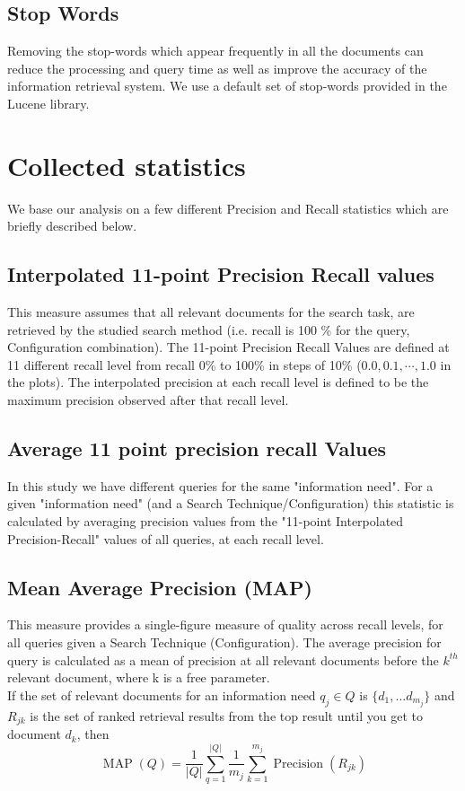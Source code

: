 \documentclass[report,draft*]{aaltoseries}
\begin{document}
\subsection{Stop Words}
Removing the stop-words which appear frequently in all the documents can reduce the processing and query time as well as improve the accuracy of the information retrieval system. We use a default set of stop-words provided in the Lucene library. 


\section{Collected statistics}
We base our analysis on a few different Precision and Recall statistics which are briefly described below.
\subsection{Interpolated 11-point Precision Recall values}
This measure assumes that all relevant documents for the search task, are retrieved by the studied search method (i.e. recall is 100 \% for the query, Configuration combination). The 11-point Precision Recall Values are defined at 11 different recall level from recall 0\% to 100\% in steps of 10\% ($0.0, 0.1,\cdots, 1.0$ in the plots). The interpolated precision at each recall level is defined to be the maximum precision observed after that recall level.        
\subsection{Average 11 point precision recall Values}
In this study we have different queries for the same "information need". For a given "information need" (and a Search Technique/Configuration) this statistic is calculated by averaging precision values from the "11-point Interpolated Precision-Recall" values of all queries, at each recall level.
\subsection{Mean Average Precision (MAP)}
This measure provides a single-figure measure of quality across recall levels, for all queries given a Search Technique (Configuration).  The average precision for query is calculated as a mean of precision at all relevant documents before the $k^{th}$ relevant document, where k is a free parameter. \\
If the set of relevant documents for an information need $q_j \in Q$ is  $\{d_1,
\ldots d_{m_j}\}$ and  $R_{jk}$ is the set of ranked retrieval results from the top result until you get to document $d_k$, then 
\begin{equation}
\operatorname{MAP}(Q) = \frac{1}{\vert Q \vert}\sum_{q=1}^{\vert Q \vert} \frac{1}{m_j}\sum_{k=1}^{m_j}\operatorname{Precision}(R_{jk}) \!
\end{equation}
\end{document}
